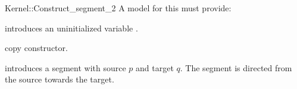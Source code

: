 \begin{ccRefFunctionObjectConcept}{Kernel::Construct_segment_2}
A model for this must provide:




\ccHidden {}
             {introduces an uninitialized variable .}

\ccHidden {}
 	    {copy constructor.}

            {introduces a segment  with source $p$
             and target $q$. The segment is directed from the source towards
             the target.}

\end{ccRefFunctionObjectConcept}
